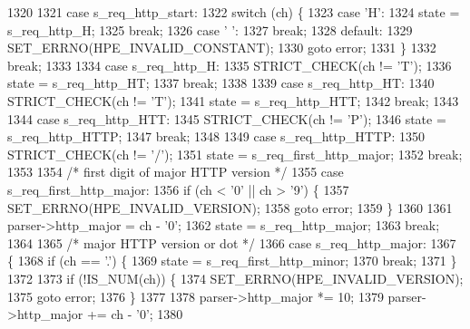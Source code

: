 \begin{DoxyCode}
1320 
1321       \textcolor{keywordflow}{case} s_req_http_start:
1322         \textcolor{keywordflow}{switch} (ch) \{
1323           \textcolor{keywordflow}{case} \textcolor{charliteral}{'H'}:
1324             state = s_req_http_H;
1325             \textcolor{keywordflow}{break};
1326           \textcolor{keywordflow}{case} \textcolor{charliteral}{' '}:
1327             \textcolor{keywordflow}{break};
1328           \textcolor{keywordflow}{default}:
1329             SET_ERRNO(HPE_INVALID_CONSTANT);
1330             \textcolor{keywordflow}{goto} error;
1331         \}
1332         \textcolor{keywordflow}{break};
1333 
1334       \textcolor{keywordflow}{case} s_req_http_H:
1335         STRICT_CHECK(ch != \textcolor{charliteral}{'T'});
1336         state = s_req_http_HT;
1337         \textcolor{keywordflow}{break};
1338 
1339       \textcolor{keywordflow}{case} s_req_http_HT:
1340         STRICT_CHECK(ch != \textcolor{charliteral}{'T'});
1341         state = s_req_http_HTT;
1342         \textcolor{keywordflow}{break};
1343 
1344       \textcolor{keywordflow}{case} s_req_http_HTT:
1345         STRICT_CHECK(ch != \textcolor{charliteral}{'P'});
1346         state = s_req_http_HTTP;
1347         \textcolor{keywordflow}{break};
1348 
1349       \textcolor{keywordflow}{case} s_req_http_HTTP:
1350         STRICT_CHECK(ch != \textcolor{charliteral}{'/'});
1351         state = s_req_first_http_major;
1352         \textcolor{keywordflow}{break};
1353 
1354       \textcolor{comment}{/* first digit of major HTTP version */}
1355       \textcolor{keywordflow}{case} s_req_first_http_major:
1356         \textcolor{keywordflow}{if} (ch < '0' || ch > \textcolor{charliteral}{'9'}) \{
1357           SET_ERRNO(HPE_INVALID_VERSION);
1358           \textcolor{keywordflow}{goto} error;
1359         \}
1360 
1361         parser->http_major = ch - \textcolor{charliteral}{'0'};
1362         state = s_req_http_major;
1363         \textcolor{keywordflow}{break};
1364 
1365       \textcolor{comment}{/* major HTTP version or dot */}
1366       \textcolor{keywordflow}{case} s_req_http_major:
1367       \{
1368         \textcolor{keywordflow}{if} (ch == \textcolor{charliteral}{'.'}) \{
1369           state = s_req_first_http_minor;
1370           \textcolor{keywordflow}{break};
1371         \}
1372 
1373         \textcolor{keywordflow}{if} (!IS_NUM(ch)) \{
1374           SET_ERRNO(HPE_INVALID_VERSION);
1375           \textcolor{keywordflow}{goto} error;
1376         \}
1377 
1378         parser->http_major *= 10;
1379         parser->http_major += ch - \textcolor{charliteral}{'0'};
1380 

\end{DoxyCode}
